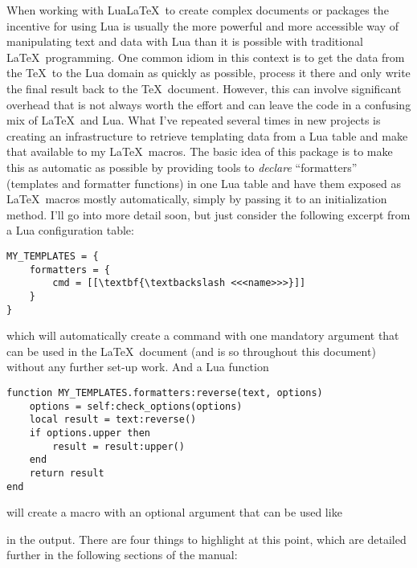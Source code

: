 \documentclass{scrartcl}
\begin{document}
When working with Lua\LaTeX\ to create complex documents or packages the
incentive for using Lua is usually the more powerful and more accessible way of
manipulating text and data with Lua than it is possible with traditional \LaTeX\
programming.  One common idiom in this context is to get the data from the \TeX\
to the Lua domain as quickly as possible, process it there and only write the
final result back to the \TeX\ document.  However, this can involve significant
overhead that is not always worth the effort and can leave the code in a
confusing mix of \LaTeX\ and Lua.  What I've repeated several times in new
projects is creating an infrastructure to retrieve templating data from a Lua
table and make that available to my \LaTeX\ macros.  The basic idea of this
package is to make this as automatic as possible by providing tools to
\emph{declare} “formatters” (templates and formatter functions) in one Lua table
and have them exposed as \LaTeX\ macros mostly automatically, simply by passing
it to an initialization method. I'll go into more detail soon, but just consider
the following excerpt from a Lua configuration table:

\begin{verbatim}
MY_TEMPLATES = {
    formatters = {
        cmd = [[\textbf{\textbackslash <<<name>>>}]]
    }
}
\end{verbatim}

\noindent which will automatically create a command
with one mandatory argument that can be used in the \LaTeX\ document (and is so
throughout this document) without any further set-up work.  And a Lua function

\label{code:function}
\begin{verbatim}
function MY_TEMPLATES.formatters:reverse(text, options)
    options = self:check_options(options)
    local result = text:reverse()
    if options.upper then
        result = result:upper()
    end
    return result
end
\end{verbatim}

\noindent will create a macro  with an optional
argument that can be used like

%
in the output.  There are four things
to highlight at this point, which are detailed further in the following sections
of the manual:
\end{document}
